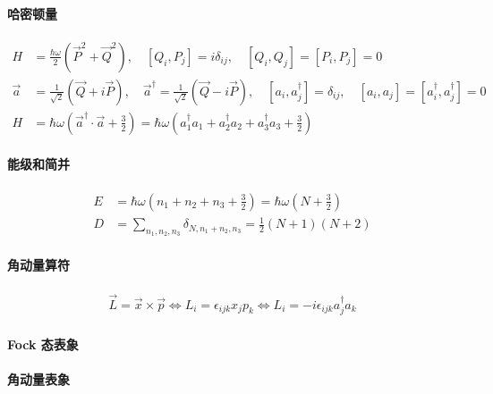 \documentclass[../../main.tex]{subfiles}
\begin{document}
\paragraph{哈密顿量}
\begin{align*}
    H &= \frac{\hbar\omega}{2}\left(\vec{P}^{2} + \vec{Q}^{2}\right), \quad [Q_{i},P_{j}] = i\delta_{ij},\quad [Q_{i},Q_{j}] = [P_{i},P_{j}] = 0\\
    \vec{a} &= \frac{1}{\sqrt{2}}(\vec{Q} + i\vec{P}),\quad \vec{a}^{\dagger} = \frac{1}{\sqrt{2}}(\vec{Q} - i\vec{P}),\quad [a_{i},a_{j}^{\dagger}] = \delta_{ij},\quad [a_{i},a_{j}] = [a_{i}^{\dagger},a_{j}^{\dagger}] = 0\\
    H &= \hbar\omega\left(\vec{a}^{\dagger}\cdot\vec{a} + \frac{3}{2}\right) = \hbar\omega\left(a^{\dagger}_{1}a_{1} + a^{\dagger}_{2}a_{2} + a^{\dagger}_{3}a_{3} + \frac{3}{2}\right)
\end{align*}
\paragraph{能级和简并}
\begin{align*}
    E &= \hbar\omega\left(n_{1} + n_{2} + n_{3} + \frac{3}{2}\right) = \hbar\omega\left(N+\frac{3}{2}\right)\\
    D &= \sum_{n_{1},n_{2},n_{3}}\delta_{N,n_{1}+n_{2},n_{3}} = \frac{1}{2}(N+1)(N+2)
\end{align*}
\paragraph{角动量算符}
\begin{align*}
    \vec{L} = \vec{x}\times\vec{p}\iff L_{i} = \epsilon_{ijk}x_{j}p_{k}\iff L_{i} = -i\epsilon_{ijk}a_{j}^{\dagger}a_{k}
\end{align*}
\paragraph{Fock 态表象}
\paragraph{角动量表象}
\end{document}
